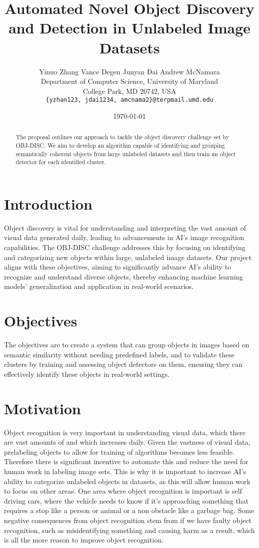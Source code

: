 \documentclass{article}
\title{Automated Novel Object Discovery and Detection in Unlabeled Image Datasets}
\author{%
	Yinuo Zhang \AND Vance Degen \AND Junyan Dai \AND Andrew McNamara\\
	Department of Computer Science, University of Maryland\\
	College Park, MD 20742, USA\\
	\texttt{\{yzhan123, jdai1234, amcnama2\}@terpmail.umd.edu}}
\date{\today}
\begin{document}
	
	
	\maketitle
	
	
	\begin{abstract}
		The proposal outlines our approach to tackle the object discovery challenge set by OBJ-DISC. We aim to develop an algorithm capable of identifying and grouping semantically coherent objects from large unlabeled datasets and then train an object detector for each identified cluster.
	\end{abstract}
	
	
	\section{Introduction}
	
	
	Object discovery is vital for understanding and interpreting the vast amount of visual data generated daily, leading to advancements in AI's image recognition capabilities. The OBJ-DISC challenge addresses this by focusing on identifying and categorizing new objects within large, unlabeled image datasets. Our project aligns with these objectives, aiming to significantly advance AI's ability to recognize and understand diverse objects, thereby enhancing machine learning models' generalization and application in real-world scenarios.
	
	
	\section{Objectives}

	
	The objectives are to create a system that can group objects in images based on semantic similarity without needing predefined labels, and to validate these clusters by training and assessing object detectors on them, ensuring they can effectively identify these objects in real-world settings.
	
	 \section{Motivation}
	
    Object recognition is very important in understanding visual data, which there are vast amounts of and which increases daily. Given the vastness of visual data, prelabeling objects to allow for training of algorithms becomes less feasible. Therefore there is significant incentive to automate this and reduce the need for human work in labeling image sets. This is why it is important to increase AI's ability to categorize unlabeled objects in datasets, as this will allow human work to focus on other areas. One area where object recognition is important is self driving cars, where the vehicle needs to know if it's approaching something that requires a stop like a person or animal or a non obstacle like a garbage bag. Some negative consequences from object recognition stem from if we have faulty object recognition, such as misidentifying something and causing harm as a result, which is all the more reason to improve object recognition.
\end{document}
